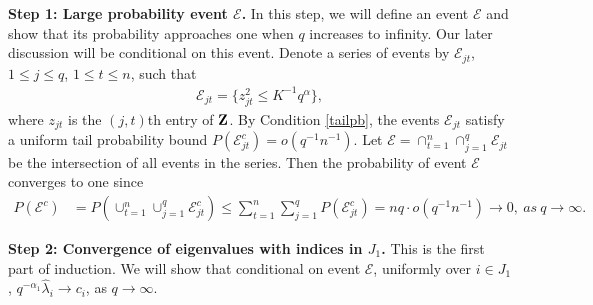 \documentclass{statsoc}
\newcommand{\bZ}{\mbox{\bf Z}}
\begin{document}
\medskip

\noindent \textbf{Step 1: Large probability event $\mathcal{E}$.} In this step, we will define an event $\mathcal{E}$ and show that its probability approaches one when $q$ increases to infinity. Our later discussion will be conditional on this event. Denote a series of events by $\mathcal{E}_{jt}$, $1 \leq j \leq q$, $1 \leq t \leq n$, such that
\begin{align*}
\mathcal{E}_{jt} = \{z_{jt}^2 \leq K^{-1} q^{\alpha}\},
\end{align*}
where $z_{jt}$ is the $(j,t)$th entry of $\bZ$. By Condition \ref{tailpb}, the events $\mathcal{E}_{jt}$ satisfy a uniform tail probability bound $P(\mathcal{E}_{jt}^c) = o(q^{-1} n^{-1})$. Let $\mathcal{E} = \cap_{t = 1}^n \cap_{j = 1}^q \mathcal{E}_{jt}$ be the intersection of all events in the series. Then the probability of event $\mathcal{E}$ converges to one since
\begin{align*}
P(\mathcal{E}^c) & = P(\cup_{t = 1}^n \cup_{j = 1}^q \mathcal{E}_{jt}^c) \leq \sum_{t = 1}^n \sum_{j = 1}^q P(\mathcal{E}_{jt}^c) = n q \cdot o(q^{-1} n^{-1}) \to 0, \ as \ q \to \infty.
\end{align*}
\medskip

\noindent \textbf{Step 2: Convergence of eigenvalues with indices in $J_1$.} This is the first part of induction. We will show that conditional on event $\mathcal{E}$, uniformly over $i \in J_1$, $q^{-\alpha_1} \widehat{\lambda}_i \to c_i$, as $q \to \infty$.
\end{document}
